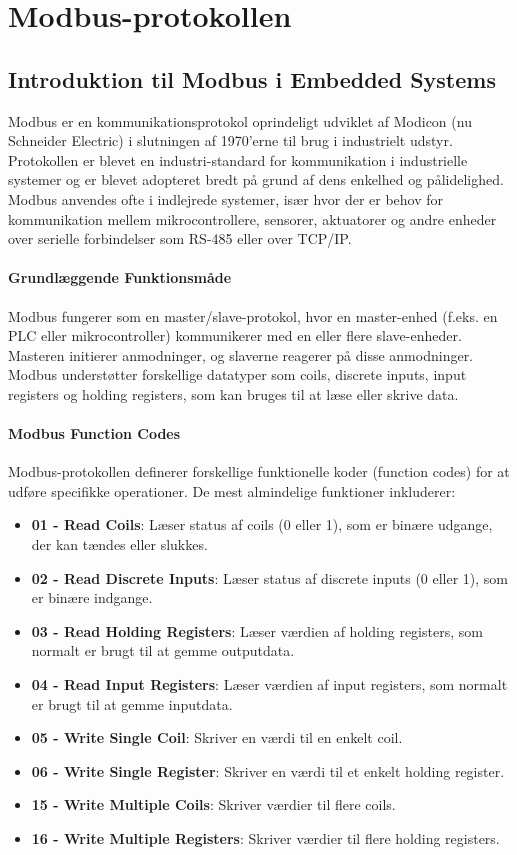 \section{Modbus-protokollen}

\subsection{Introduktion til Modbus i Embedded Systems}
Modbus er en kommunikationsprotokol oprindeligt udviklet af Modicon (nu Schneider Electric) i slutningen af 1970'erne til brug i industrielt udstyr. Protokollen er blevet en industri-standard for kommunikation i industrielle systemer og er blevet adopteret bredt på grund af dens enkelhed og pålidelighed. Modbus anvendes ofte i indlejrede systemer, især hvor der er behov for kommunikation mellem mikrocontrollere, sensorer, aktuatorer og andre enheder over serielle forbindelser som RS-485 eller over TCP/IP.

\paragraph{Grundlæggende Funktionsmåde}
Modbus fungerer som en master/slave-protokol, hvor en master-enhed (f.eks. en PLC eller mikrocontroller) kommunikerer med en eller flere slave-enheder. Masteren initierer anmodninger, og slaverne reagerer på disse anmodninger. Modbus understøtter forskellige datatyper som coils, discrete inputs, input registers og holding registers, som kan bruges til at læse eller skrive data.

\paragraph{Modbus Function Codes}
Modbus-protokollen definerer forskellige funktionelle koder (function codes) for at udføre specifikke operationer. De mest almindelige funktioner inkluderer:
\begin{itemize}
	\item \textbf{01 - Read Coils}: Læser status af coils (0 eller 1), som er binære udgange, der kan tændes eller slukkes.
	\item \textbf{02 - Read Discrete Inputs}: Læser status af discrete inputs (0 eller 1), som er binære indgange.
	\item \textbf{03 - Read Holding Registers}: Læser værdien af holding registers, som normalt er brugt til at gemme outputdata.
	\item \textbf{04 - Read Input Registers}: Læser værdien af input registers, som normalt er brugt til at gemme inputdata.
	\item \textbf{05 - Write Single Coil}: Skriver en værdi til en enkelt coil.
	\item \textbf{06 - Write Single Register}: Skriver en værdi til et enkelt holding register.
	\item \textbf{15 - Write Multiple Coils}: Skriver værdier til flere coils.
	\item \textbf{16 - Write Multiple Registers}: Skriver værdier til flere holding registers.
\end{itemize}


